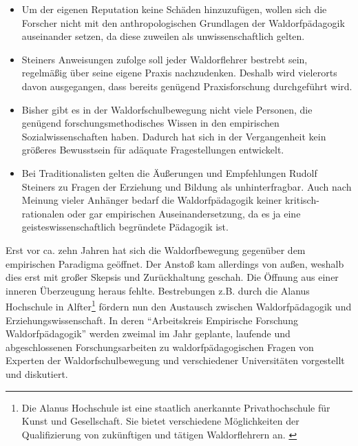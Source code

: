 	\begin{itemize}
    	\item Um der eigenen Reputation keine Schäden hinzuzufügen, wollen sich die Forscher nicht mit den anthropologischen Grundlagen der Waldorfpädagogik auseinander setzen, da diese zuweilen als unwissenschaftlich gelten.

    	\item Steiners Anweisungen zufolge soll jeder Waldorflehrer bestrebt sein, regelmäßig über seine eigene Praxis nachzudenken. Deshalb wird vielerorts davon ausgegangen, dass bereits genügend Praxisforschung durchgeführt wird.

    	\item Bisher gibt es in der Waldorfschulbewegung nicht viele Personen, die genügend forschungsmethodisches Wissen in den empirischen Sozialwissenschaften haben. Dadurch hat sich in der Vergangenheit kein größeres Bewusstsein für adäquate Fragestellungen entwickelt. 

    	\item Bei Traditionalisten gelten die Äußerungen und Empfehlungen Rudolf Steiners zu Fragen der Erziehung und Bildung als unhinterfragbar. Auch nach Meinung vieler Anhänger bedarf die Waldorfpädagogik keiner kritisch-rationalen oder gar empirischen Auseinandersetzung, da es ja eine geisteswissenschaftlich begründete Pädagogik ist.
    \end{itemize}


Erst vor ca. zehn Jahren hat sich die Waldorfbewegung gegenüber dem empirischen Paradigma geöffnet. Der Anstoß kam allerdings von außen, weshalb dies erst mit großer Skepsis und Zurückhaltung geschah. Die Öffnung aus einer inneren Überzeugung heraus fehlte. Bestrebungen z.B. durch die Alanus Hochschule in Alfter\footnote{Die Alanus Hochschule ist eine staatlich anerkannte Privathochschule für Kunst und Gesellschaft. Sie bietet verschiedene Möglichkeiten der Qualifizierung von zukünftigen und tätigen Waldorflehrern an. \citep[Vgl.][]{alanus13}} fördern nun den Austausch zwischen Waldorfpädagogik und Erziehungswissenschaft. In deren \enquote{Arbeitskreis Empirische Forschung Waldorfpädagogik} werden zweimal im Jahr geplante, laufende und abgeschlossenen Forschungsarbeiten zu waldorfpädagogischen Fragen von Experten der Waldorfschulbewegung und verschiedener Universitäten vorgestellt und diskutiert.  \citep[Vgl.][S. 128]{paschen10}

